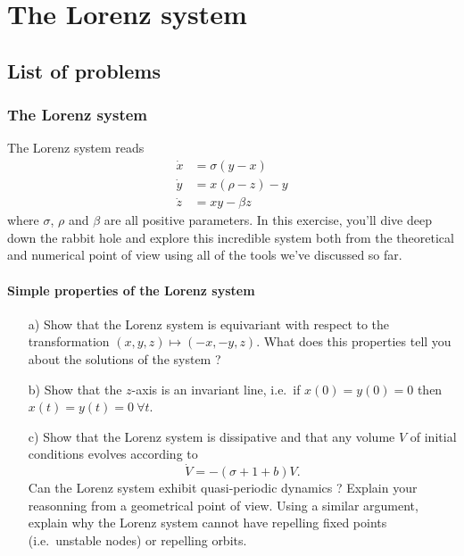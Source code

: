 \section{The Lorenz system}

\subsection{List of problems}

\subsubsection*{The Lorenz system}

\begin{problem}
  The Lorenz system reads
  \[
  \begin{aligned}
    \dot{x} & = \sigma ( y - x ) \\
    \dot{y} & = x( \rho - z) - y\\
    \dot{z} & = xy - \beta z
  \end{aligned}
  \]
  where $\sigma$, $\rho$ and $\beta$ are all positive parameters.
  In this exercise, you'll dive deep down the rabbit hole and explore this incredible system both from the theoretical and numerical point of view using all of the tools we've discussed so far.

  \paragraph{Simple properties of the Lorenz system}
  \begin{enumerate}
  \item[a)] Show that the Lorenz system is equivariant with respect to the transformation $(x, y, z) \mapsto (-x, -y, z)$.
    What does this properties tell you about the solutions of the system ?

  \item[b)] Show that the $z$-axis is an invariant line, i.e.\ if $x(0) = y(0) = 0$ then $x(t) = y(t) = 0\ \forall t$.

  \item[c)] Show that the Lorenz system is dissipative and that any volume $V$ of initial conditions evolves according to
    \[
    \dot{V} = -\left( \sigma + 1 + b \right) V.
    \]
    Can the Lorenz system exhibit quasi-periodic dynamics ? Explain your reasonning from a geometrical point of view.
    Using a similar argument, explain why the Lorenz system cannot have repelling fixed points (i.e.\ unstable nodes) or repelling orbits.


\end{enumerate}
\end{problem}
